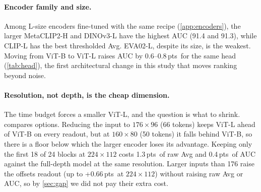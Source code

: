\documentclass[10pt,twocolumn,letterpaper]{article}
\newcommand{\pts}{\,pts}
\begin{document}
\begin{table}[t]
\centering\small
\setlength{\tabcolsep}{3.5pt}
\caption{Linear versus query head (PETA held out, 5 epochs). The query head wins every thresholded readout and loses on AUC.}
\label{tab:head}
\end{table}

\paragraph{Encoder family and size.} Among L-size encoders fine-tuned with the same recipe (\cref{app:encoders}), the larger MetaCLIP2-H and DINOv3-L have the highest AUC (91.4 and 91.3), while CLIP-L has the best thresholded Avg. EVA02-L, despite its size, is the weakest. Moving from ViT-B to ViT-L raises AUC by 0.6--0.8\pts\ for the same head (\cref{tab:head}), the first architectural change in this study that moves ranking beyond noise.

\paragraph{Resolution, not depth, is the cheap dimension.} The time budget forces a smaller ViT-L, and the question is what to shrink.  compares options. Reducing the input to $176\times96$ (66 tokens) keeps ViT-L ahead of ViT-B on every readout, but at $160\times80$ (50 tokens) it falls behind ViT-B, so there is a floor below which the larger encoder loses its advantage. Keeping only the first 18 of 24 blocks at $224\times112$ costs 1.3\pts\ of raw Avg and 0.4\pts\ of AUC against the full-depth model at the same resolution. Larger inputs than 176 raise the offsets readout (up to +0.66\pts\ at $224\times112$) without raising raw Avg or AUC, so by \cref{sec:gap} we did not pay their extra cost.
\end{document}

